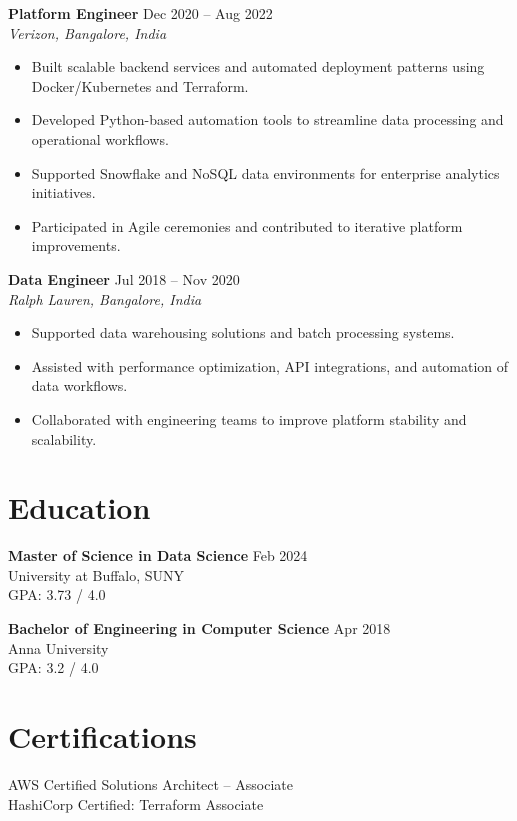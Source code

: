 \documentclass[10pt]{article}
\begin{document}
\textbf{Platform Engineer} \hfill Dec 2020 -- Aug 2022 \\
\textit{Verizon, Bangalore, India}
\begin{itemize}[leftmargin=*, itemsep=3pt]
    \item Built scalable backend services and automated deployment patterns using Docker/Kubernetes and Terraform.
    \item Developed Python-based automation tools to streamline data processing and operational workflows.
    \item Supported Snowflake and NoSQL data environments for enterprise analytics initiatives.
    \item Participated in Agile ceremonies and contributed to iterative platform improvements.
\end{itemize}

\textbf{Data Engineer} \hfill Jul 2018 -- Nov 2020 \\
\textit{Ralph Lauren, Bangalore, India}
\begin{itemize}[leftmargin=*, itemsep=3pt]
    \item Supported data warehousing solutions and batch processing systems.
    \item Assisted with performance optimization, API integrations, and automation of data workflows.
    \item Collaborated with engineering teams to improve platform stability and scalability.
\end{itemize}

\section*{Education}

\textbf{Master of Science in Data Science} \hfill Feb 2024 \\
University at Buffalo, SUNY \\
GPA: 3.73 / 4.0

\textbf{Bachelor of Engineering in Computer Science} \hfill Apr 2018 \\
Anna University \\
GPA: 3.2 / 4.0

\section*{Certifications}
AWS Certified Solutions Architect – Associate \\
HashiCorp Certified: Terraform Associate
\end{document}
